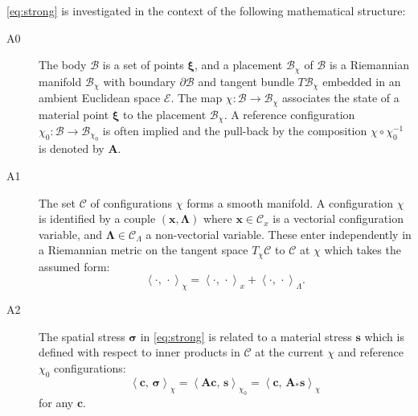 \eqref{eq:strong} is investigated in the context of the following
mathematical structure:

\begin{description}
\item[A0]
The body \(\mathcal{B}\) is a set of points \(\boldsymbol{\xi}\), and a placement
\(\mathcal{B}_\chi\) of \(\mathcal{B}\) is a Riemannian manifold
\(\mathcal{B}_\chi\) with boundary \(\partial \mathcal{B}\) and tangent
bundle \(T\mathcal{B}_\chi\) embedded in an ambient Euclidean space
\(\mathcal{E}\). The map
\(\chi\colon \mathcal{B}\rightarrow \mathcal{B}_\chi\) associates the
state of a material point \(\boldsymbol{\xi}\) to the placement
\(\mathcal{B}_\chi\). A reference configuration
\(\chi_0\colon \mathcal{B}\rightarrow \mathcal{B}_{\chi_0}\) is often
implied and the pull-back by the composition \(\chi\circ\chi_0^{-1}\) is
denoted by \(\boldsymbol{A}\).
\item[A1]
The set \(\mathscr{C}\) of configurations \(\chi\) forms a smooth
 manifold. A configuration \(\chi\) is identified by a couple
\((\boldsymbol{x}, \boldsymbol{\Lambda})\) where \(\boldsymbol{x}\in\mathscr{C}_x\) is a
vectorial configuration variable, and
\(\boldsymbol{\Lambda}\in\mathscr{C}_{\scriptscriptstyle{\Lambda}}\) a
non-vectorial variable. These enter independently in a Riemannian metric
on the tangent space \(T_\chi\mathscr{C}\) to \(\mathscr{C}\) at
\(\chi\) which takes the assumed form: 
\begin{equation}
  \left< \cdot , \, \cdot\right>_{\chi} = \left< \cdot , \, \cdot\right>_{x} + \left< \cdot , \, \cdot\right>_{\scriptscriptstyle{\Lambda}} .
  \label{eq:conf-pair}
\end{equation}
%
\item[A2]
The spatial stress \(\boldsymbol{\sigma}\) in \eqref{eq:strong} is related to a
material stress \(\boldsymbol{s}\) which is defined with respect to inner products 
in \(\mathscr{C}\) at the current \(\chi\) and reference
\(\chi_0\) configurations:
\begin{equation}
  \left<\boldsymbol{c},\, \boldsymbol{\sigma}\right>_{\chi}
  =\left< \boldsymbol{A}\boldsymbol{c},\, \boldsymbol{s}\right>_{\chi_0}
  = \left<\boldsymbol{c},\, \boldsymbol{A}_*\boldsymbol{s}\right>_{\chi}
  \label{eq:def-Astar}
\end{equation}
for any \(\boldsymbol{c}\).

\end{description}
